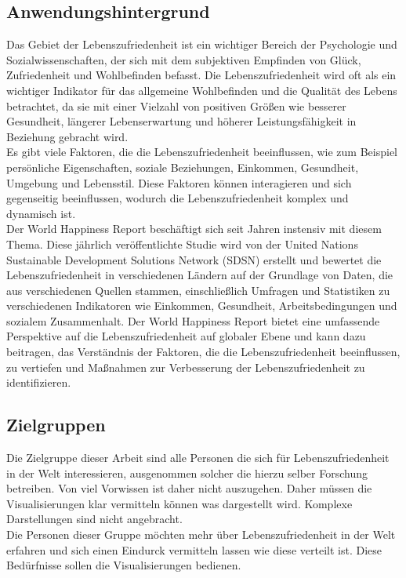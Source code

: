 \subsection{Anwendungshintergrund}
Das Gebiet der Lebenszufriedenheit ist ein wichtiger Bereich der Psychologie und Sozialwissenschaften, der sich mit dem subjektiven Empfinden von Glück, Zufriedenheit und Wohlbefinden befasst. Die Lebenszufriedenheit wird oft als ein wichtiger Indikator für das allgemeine Wohlbefinden und die Qualität des Lebens betrachtet, da sie mit einer Vielzahl von positiven Größen wie besserer Gesundheit, längerer Lebenserwartung und höherer Leistungsfähigkeit in Beziehung gebracht wird.
\\

Es gibt viele Faktoren, die die Lebenszufriedenheit beeinflussen, wie zum Beispiel persönliche Eigenschaften, soziale Beziehungen, Einkommen, Gesundheit, Umgebung und Lebensstil. Diese Faktoren können interagieren und sich gegenseitig beeinflussen, wodurch die Lebenszufriedenheit komplex und dynamisch ist.
\\

Der World Happiness Report beschäftigt sich seit Jahren instensiv mit diesem Thema. Diese jährlich veröffentlichte Studie wird von der United Nations Sustainable Development Solutions Network (SDSN) erstellt und bewertet die Lebenszufriedenheit in verschiedenen Ländern auf der Grundlage von Daten, die aus verschiedenen Quellen stammen, einschließlich Umfragen und Statistiken zu verschiedenen Indikatoren wie Einkommen, Gesundheit, Arbeitsbedingungen und sozialem Zusammenhalt. Der World Happiness Report bietet eine umfassende Perspektive auf die Lebenszufriedenheit auf globaler Ebene und kann dazu beitragen, das Verständnis der Faktoren, die die Lebenszufriedenheit beeinflussen, zu vertiefen und Maßnahmen zur Verbesserung der Lebenszufriedenheit zu identifizieren. 


\subsection{Zielgruppen}

Die Zielgruppe dieser Arbeit sind alle Personen die sich für Lebenszufriedenheit in der Welt interessieren, ausgenommen solcher die hierzu selber Forschung betreiben. Von viel Vorwissen ist daher nicht auszugehen. Daher müssen die Visualisierungen klar vermitteln können was dargestellt wird. Komplexe Darstellungen sind nicht angebracht. \\
Die Personen dieser Gruppe möchten mehr über Lebenszufriedenheit in der Welt erfahren und sich einen Eindurck vermitteln lassen wie diese verteilt ist. Diese Bedürfnisse sollen die Visualisierungen bedienen. 

